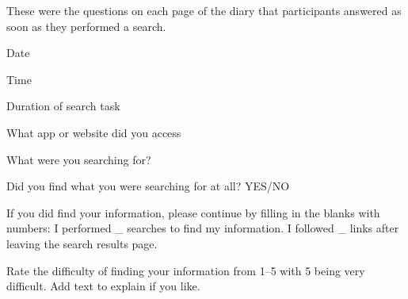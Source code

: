 %
These were the questions on each page of the diary that participants answered as soon as they performed a search.
\begin{tight_enumerate}
            \item Date
            \item Time
            \item Duration of search task 
            \item What app or website did you access
            \item What were you searching for?
            \item Did you find what you were searching for at all? YES/NO
            \item If you did find your information, please continue by filling in the blanks with numbers: I performed \_ searches to find my information. I followed \_ links after leaving the search results page.
            \item Rate the difficulty of finding your information from 1--5 with 5 being very difficult. Add text to explain if you like.
\end{tight_enumerate}


%


%

